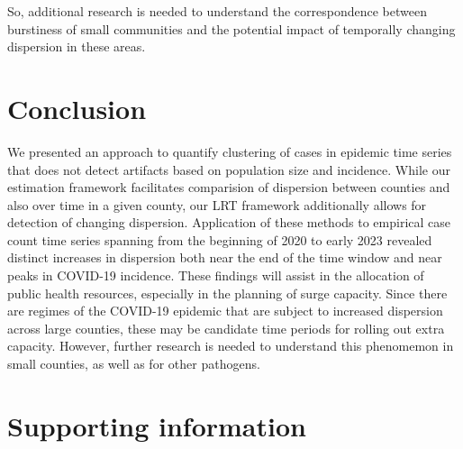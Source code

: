 \documentclass[10pt,letterpaper]{article}
\begin{document}
So, additional research is needed to understand the correspondence between burstiness of small communities and the potential impact of temporally changing dispersion in these areas.

\section*{Conclusion}
We presented an approach to quantify clustering of cases in epidemic time series that does not detect artifacts based on population size and incidence. 
While our estimation framework facilitates comparision of dispersion between counties and also over time in a given county, our LRT framework additionally allows for detection of changing dispersion. 
Application of these methods to empirical case count time series spanning from the beginning of 2020 to early 2023 revealed distinct increases in dispersion both near the end of the time window and near peaks in COVID-19 incidence. 
These findings will assist in the allocation of public health resources, especially in the planning of surge capacity. Since there are regimes of the COVID-19 epidemic that are subject to increased dispersion across large counties, these may be candidate time periods for rolling out extra capacity. However, further research is needed to understand this phenomemon in small counties, as well as for other pathogens.

\section*{Supporting information}

\end{document}
